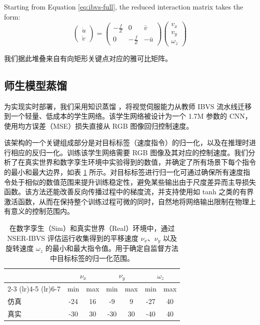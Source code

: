 \documentclass[10pt,twocolumn,letterpaper]{article}
\begin{document}
Starting from Equation \ref{eq:ibvs-full}, the reduced interaction matrix takes the form:
\begin{equation}
\label{eq:numerical-stable-efficient-reduced-ibvs}
\begin{pmatrix}
\dot{u} \\
\dot{v}
\end{pmatrix} = \begin{pmatrix}
-\frac{f}{Z} & 0 & \bar{v} \\
0 & -\frac{f}{Z} & -\bar{u}
\end{pmatrix} \begin{pmatrix}
v_x \\
v_y \\
\omega_z
\end{pmatrix}
\end{equation}

我们据此堆叠来自有向矩形关键点对应的雅可比矩阵。

\subsection{师生模型蒸馏}
\label{sec:know_dist}

为实现实时部署，我们采用知识蒸馏 \cite{hinton2015distillingknowledgeneuralnetwork}，将视觉伺服能力从教师 IBVS 流水线迁移到一个轻量、低成本的学生网络。该学生网络被设计为一个 1.7M 参数的 CNN，使用均方误差（MSE）损失直接从 RGB 图像回归控制速度。

该架构的一个关键组成部分是对目标标签（速度指令）的归一化，以及在推理时进行相应的反归一化。训练该学生网络需要 RGB 图像及其对应的控制速度。我们分析了在真实世界和数字孪生环境中实验得到的数值，并确定了所有场景下每个指令的最小和最大边界，如表 \ref{tab:cmd-values} 所示。对目标标签进行归一化可通过确保所有速度指令处于相似的数值范围来提升训练稳定性，避免某些输出由于尺度差异而主导损失函数。该方法还能改善反向传播过程中的梯度流，并支持使用如 tanh 之类的有界激活函数，从而在保持整个训练过程可微的同时，自然地将网络输出限制在物理上有意义的控制范围内。

\begin{table}[h!]
    \centering
    \begin{tabular}{lcc|cc|cc}
        & \multicolumn{2}{c}{$\nu_{x}$} & \multicolumn{2}{c}{$\nu_{y}$} & \multicolumn{2}{c}{$\omega_{z}$} \\
        \cmidrule(lr){2-3} \cmidrule(lr){4-5} \cmidrule(lr){6-7}
        & min & max & min & max & min & max \\
        \hline
        仿真  & -24 & 16 & -9 & 9 & -27 & 40 \\
        真实 & -30 & 30 & -30 & 30 & -40 & 40 \\
        \bottomrule
    \end{tabular}
    \caption{在数字孪生（Sim）和真实世界（Real）环境中，通过 NSER-IBVS 评估运行收集得到的平移速度 $\nu_{x}$、$\nu_{y}$ 以及旋转速度 $\omega_{z}$ 的最小和最大指令值。用于确定自监督方法中目标标签的归一化范围。}
    \label{tab:cmd-values}
\end{table}
\end{document}
